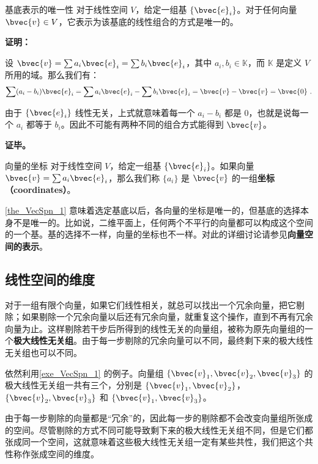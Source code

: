 \begin{theorem}{基底表示的唯一性}\label{the_VecSpn_1}
对于线性空间 $V$，给定一组基 $\{\bvec{e}_i\}$。对于任何向量 $\bvec{v}\in V$，它表示为该基底的线性组合的方式是唯一的。
\end{theorem}

\textbf{证明：}

设 $\bvec{v}=\sum a_i\bvec{e}_i=\sum b_i\bvec{e}_i$，其中 $a_i, b_i\in \mathbb{K}$，而 $\mathbb{K}$ 是定义 $V$ 所用的域。那么我们有：
\begin{equation}
\sum(a_i-b_i)\bvec{e}_i=\sum a_i\bvec{e}_i-\sum b_i\bvec{e}_i=\bvec{v}-\bvec{v}=\bvec{0}~.
\end{equation}

由于 $\{\bvec{e}_i\}$ 线性无关，上式就意味着每一个 $a_i-b_i$ 都是 $0$，也就是说每一个 $a_i$ 都等于 $b_i$。因此不可能有两种不同的组合方式能得到 $\bvec{v}$。

\textbf{证毕。}

\begin{definition}{向量的坐标}
对于线性空间 $V$，给定一组基 $\{\bvec{e}_i\}$。如果向量 $\bvec{v}=\sum a_i\bvec{e}_i$，那么我们称 $\{a_i\}$ 是 $\bvec{v}$ 的一组\textbf{坐标（coordinates）}。
\end{definition}

\autoref{the_VecSpn_1} 意味着选定基底以后，各向量的坐标是唯一的，但基底的选择本身不是唯一的。比如说，二维平面上，任何两个不平行的向量都可以构成这个空间的一个基。基的选择不一样，向量的坐标也不一样。对此的详细讨论请参见\textbf{向量空间的表示}。

\subsection{线性空间的维度}

对于一组有限个向量，如果它们线性相关，就总可以找出一个冗余向量，把它剔除；如果剔除一个冗余向量以后还有冗余向量，就重复这个操作，直到不再有冗余向量为止。这样剔除若干步后所得到的线性无关的向量组，被称为原先向量组的一个\textbf{极大线性无关组}。由于每一步剔除的冗余向量可以不同，最终剩下来的极大线性无关组也可以不同。

\begin{example}{}
依然利用\autoref{exe_VecSpn_1} 的例子。向量组 $\{\bvec{v}_1, \bvec{v}_2, \bvec{v}_3\}$ 的极大线性无关组一共有三个，分别是 $\{\bvec{v}_1, \bvec{v}_2\}$，$\{\bvec{v}_2, \bvec{v}_3\}$ 和 $\{\bvec{v}_1, \bvec{v}_3\}$。
\end{example}

由于每一步剔除的向量都是“冗余”的，因此每一步的剔除都不会改变向量组所张成的空间。尽管剔除的方式不同可能导致剩下来的极大线性无关组不同，但是它们都张成同一个空间，这就意味着这些极大线性无关组一定有某些共性，我们把这个共性称作张成空间的维度。

